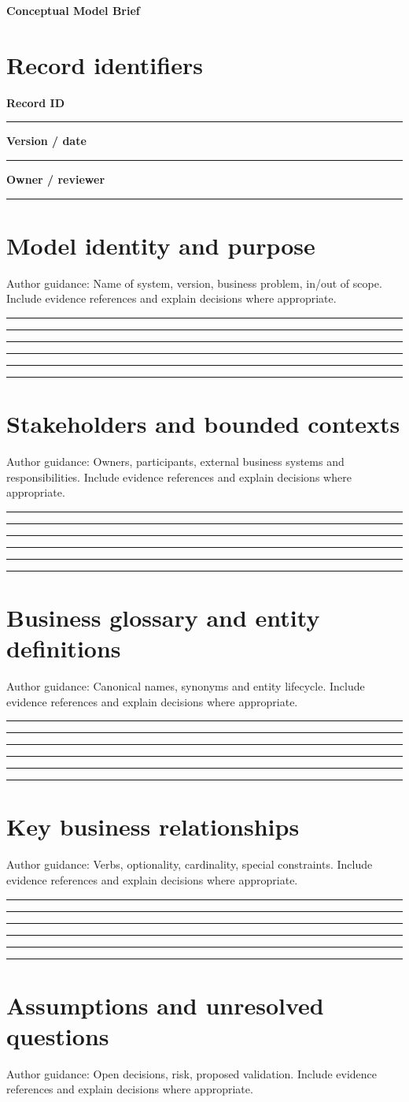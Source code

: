 \documentclass[11pt,letterpaper]{article}
\newcommand{\ResponseLine}{\par\vspace{1.05em}\noindent\rule{\linewidth}{0.4pt}\par}
\newcommand{\ResponseArea}{\ResponseLine\ResponseLine\ResponseLine}
\begin{document}
\begin{center}
{\LARGE\bfseries\color{navy} Conceptual Model Brief}\par
\vspace{0.25em}{\large Authoring Template | guided fields}\par
{}
\end{center}
\vspace{0.8em}
\section{Record identifiers}
\textbf{Record ID}\ResponseLine\textbf{Version / date}\ResponseLine\textbf{Owner / reviewer}\ResponseLine
\section{Model identity and purpose}
Author guidance: Name of system, version, business problem, in/out of scope. Include evidence references and explain decisions where appropriate.


\ResponseArea\ResponseArea
\section{Stakeholders and bounded contexts}
Author guidance: Owners, participants, external business systems and responsibilities. Include evidence references and explain decisions where appropriate.


\ResponseArea\ResponseArea
\section{Business glossary and entity definitions}
Author guidance: Canonical names, synonyms and entity lifecycle. Include evidence references and explain decisions where appropriate.


\ResponseArea\ResponseArea
\section{Key business relationships}
Author guidance: Verbs, optionality, cardinality, special constraints. Include evidence references and explain decisions where appropriate.


\ResponseArea\ResponseArea
\section{Assumptions and unresolved questions}
Author guidance: Open decisions, risk, proposed validation. Include evidence references and explain decisions where appropriate.
\end{document}
